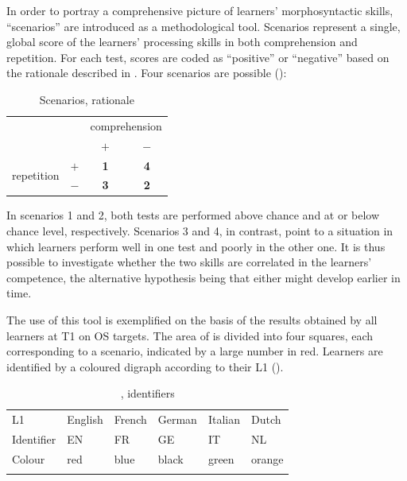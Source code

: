 In order to portray a comprehensive picture of learners’ morphosyntactic skills, “scenarios” are introduced as a methodological tool. Scenarios represent a single, global score of the learners' processing skills in both comprehension and repetition. For each test, scores are coded as ``positive'' or ``negative'' based on the rationale described in . Four scenarios are possible ():
\begin{table}
    \begin{tabular}{|lc|cc|}
    \hline
    & & \multicolumn{2}{c|}{ comprehension}\\
    &  & $+$ & $-$\\
    \hline
     \multirow{2}{*}{repetition} & $+$ & \textbf{1} & \textbf{4}\\
                                & $-$ & \textbf{3} & \textbf{2}\\
    \hline
    \end{tabular}
    \caption{Scenarios, rationale}
    \label{tab:06:2}
\end{table}

In scenarios 1 and 2, both tests are performed above chance and at or below chance level, respectively. Scenarios 3 and 4, in contrast, point to a situation in which learners perform well in one test and poorly in the other one. It is thus possible to investigate whether the two skills are correlated in the learners' competence, the alternative hypothesis being that either might develop earlier in time.

The use of this tool is exemplified on the basis of the results obtained by all learners at T1 on OS targets. The area of  is divided into four squares, each corresponding to a scenario, indicated by a large number in red. Learners are identified by a coloured digraph according to their L1 ().

\begin{table}
    \begin{tabularx}{\textwidth}{XXXXXX}
    \lsptoprule
    L1 & English & French & German & Italian & Dutch\\
    Identifier & EN & FR & GE & IT & NL\\
    Colour & red & blue & black & green & orange\\
    \lspbottomrule
    \end{tabularx}
    \caption{, identifiers}
    \label{tab:06:3}
\end{table}

